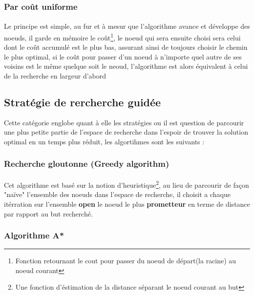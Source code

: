 \subsubsection{Par coût uniforme}
\paragraph{}
Le principe est simple, au fur et à mesur que l'algorithme avance et développe des noeuds, il garde en mémoire le coût\footnote[1]{Fonction retournant le cout pour passer du noeud de départ(la racine) au noeud courant}, le noeud qui sera ensuite choisi sera celui dont le coût accumulé est le plus bas, assurant ainsi de toujours choisir le chemin le plus optimal, si le coût pour passer d'un noeud à n'importe quel autre de ses voisins est le même quelque soit le neoud, l'algorithme est alors équivalent à celui de la recherche en largeur d'abord

\subsection{Stratégie de rercherche guidée}
Cette catégorie englobe quant à elle les stratégies ou il est question de parcourir une plus petite partie de l'espace de recherche dans l'espoir de trouver la solution optimal en un temps plus réduit, les algortihmes sont les suivants : 
\subsubsection{Recherche gloutonne (Greedy algorithm)}
\paragraph{}
Cet algorithme est basé sur la notion d'heuristique\footnote[1]{Une fonction d'éstimation de la distance séparant le noeud courant au but }, au lieu de parcourir de façon "naïve" l'ensemble des noeuds dans l'espace de recherche, il choisit a chaque itérration sur l'ensemble \textbf{open} le noeud le plus \textbf{prometteur} en terme de distance par rapport au but recherché.
\subsubsection{Algorithme A*}
